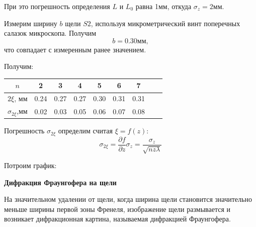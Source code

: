 \documentclass[14pt]{article}
\begin{document}
При это погрешность определения $L$ и $L_0$ равна 1мм, откуда $\sigma_z = 2$мм.

Измерим ширину $b$ щели $S2$, используя микрометрический винт поперечных салазок микроскопа. Получим
$$
	b = 0.30 \text{мм},
$$
\noindent что совпадает с измеренным ранее значением. 

Получим:
\begin{center}
\begin{tabular}{|c|c|c|c|c|c|c|c|c|}
\hline
$n$					&	2		&	3		&	4		&	5		&	6		&	7		\\
\hline
$2\xi$, мм			&	0.24	&	0.27	&	0.27	&	0.30	&	0.31	&	0.31	\\
\hline
$\sigma_{2\xi}$,мм	&	0.02	&	0.03	&	0.05	&	0.06	&	0.07	&	0.08	\\
\hline
\end{tabular}
\end{center}

Погрешность $\sigma_{2\xi}$ определим считая $\xi = f(z)$:
$$
	\sigma_{2\xi} = \frac{\partial f}{\partial z}\sigma_z = \frac{\sigma_z}{\sqrt{nz\lambda}}
$$

Потроим график:
\begin{flushleft}
\end{flushleft}

\vspace{1cm}
\textbf{Дифракция Фраунгофера на щели}

На значительном удалении от щели, когда ширина щели становится значительно меньше ширины первой зоны Френеля, изображение щели размывается и возникает дифракционная картина, называемая дифракцией Фраунгофера.
\end{document}
